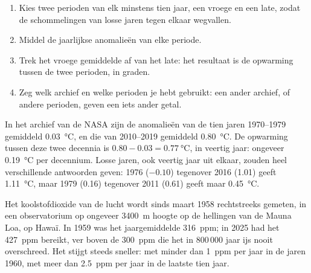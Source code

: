 \begin{method}
\begin{enumerate}
  \item Kies twee perioden van elk minstens tien jaar, een vroege en een
        late, zodat de schommelingen van losse jaren tegen elkaar wegvallen.
  \item Middel de jaarlijkse anomalieën van elke periode.
  \item Trek het vroege gemiddelde af van het late: het resultaat is de
        opwarming tussen de twee perioden, in graden.
  \item Zeg welk archief en welke perioden je hebt gebruikt: een ander
        archief, of andere perioden, geven een iets ander getal.
\end{enumerate}
\end{method}

\begin{example}
In het archief van de NASA zijn de anomalieën van de tien jaren 1970--1979
gemiddeld \qty{0.03}{\degreeCelsius}, en die van 2010--2019 gemiddeld
\qty{0.80}{\degreeCelsius}. De opwarming tussen deze twee decennia is
$0.80 - 0.03 = \qty{0.77}{\degreeCelsius}$, in veertig jaar: ongeveer
\qty{0.19}{\degreeCelsius} per decennium. Losse jaren, ook veertig jaar
uit elkaar, zouden heel verschillende antwoorden geven: 1976 ($-0.10$)
tegenover 2016 (1.01) geeft \qty{1.11}{\degreeCelsius}, maar 1979 (0.16)
tegenover 2011 (0.61) geeft maar \qty{0.45}{\degreeCelsius}.
\end{example}

Het koolstofdioxide van de lucht wordt sinds maart 1958 rechtstreeks
gemeten, in een observatorium op ongeveer \qty{3400}{m} hoogte op de
hellingen van de  Mauna Loa, op Hawaï. In 1959 was het
jaargemiddelde \qty{316}{ppm}; in 2025 had het \qty{427}{ppm} bereikt,
ver boven de \qty{300}{ppm} die het in 800\,000 jaar ijs nooit
overschreed. Het stijgt steeds sneller: met minder dan \qty{1}{ppm} per
jaar in de jaren 1960, met meer dan \qty{2.5}{ppm} per jaar in de laatste
tien jaar.

